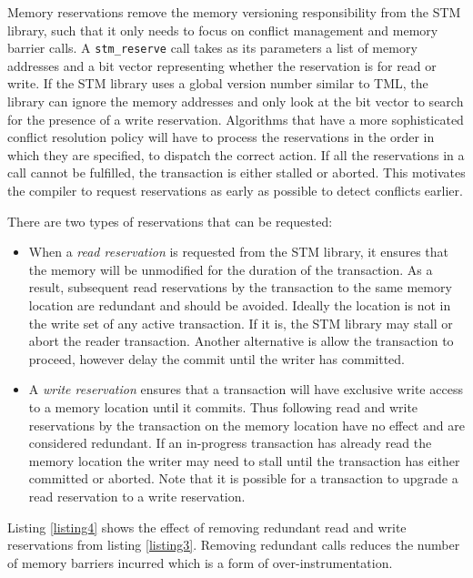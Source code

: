 \documentclass[preprint]{sigplanconf}
\begin{document}
Memory reservations remove the memory versioning responsibility from the STM library, such that it only needs to focus on conflict management and memory barrier calls. A \verb+stm_reserve+ call takes as its parameters a list of memory addresses and a bit vector representing whether the reservation is for read or write. If the STM library uses a global version number similar to TML\cite{Dalessandro:2010:TML:1885276.1885279}, the library can ignore the memory addresses and only look at the bit vector to search for the presence of a write reservation. Algorithms that have a more sophisticated conflict resolution policy will have to process the reservations in the order in which they are specified, to dispatch the correct action. If all the reservations in a call cannot be fulfilled, the transaction is either stalled or aborted. This motivates the compiler to request reservations as early as possible to detect conflicts earlier.

There are two types of reservations that can be requested:

\begin{itemize}

\item When a \emph{read reservation} is requested from the STM library, it ensures that the memory will be unmodified for the duration of the transaction. As a result, subsequent read reservations by the transaction to the same memory location are redundant and should be avoided. Ideally the location is not in the write set of any active transaction. If it is, the STM library may stall or abort the reader transaction. Another alternative is allow the transaction to proceed, however delay the commit until the writer has committed.

\item A \emph{write reservation} ensures that a transaction will have exclusive write access to a memory location until it commits. Thus following read and write reservations by the transaction on the memory location have no effect and are considered redundant. If an in-progress transaction has already read the memory location the writer may need to stall until the transaction has either committed or aborted. Note that it is possible for a transaction to upgrade a read reservation to a write reservation.

\end{itemize}

Listing \ref{listing4} shows the effect of removing redundant read and write reservations from listing \ref{listing3}. Removing redundant calls reduces the number of memory barriers incurred which is a form of over-instrumentation\cite{Yoo:2008:KTS:1378533.1378582}.
\end{document}
